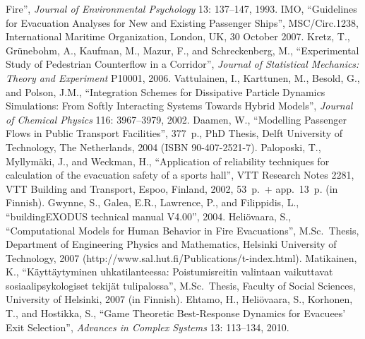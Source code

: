 \documentclass[12pt,a4paper,final,twoside]{stylevk}
\begin{document}
\begin{thebibliography}{99}
  Fire'', \emph{Journal of Environmental Psychology} 13: 137--147,
  1993.
%
%
 IMO, ``Guidelines for Evacuation Analyses for
  New and Existing Passenger Ships'', MSC/Circ.1238, International
  Maritime Organization, London, UK, 30 October 2007.
%
 Kretz, T., Gr\"unebohm, A., Kaufman, M., Mazur, F.,
  and Schreckenberg, M., ``Experimental Study of Pedestrian
  Counterflow in a Corridor'', \emph{Journal of Statistical Mechanics:
  Theory and Experiment} P10001, 2006.
%
 Vattulainen, I., Karttunen, M., Besold, G.,
  and Polson, J.M., ``Integration Schemes for Dissipative Particle
  Dynamics Simulations: From Softly Interacting Systems Towards Hybrid
  Models'', \emph{Journal of Chemical Physics} 116: 3967--3979, 2002.
%
 Daamen, W., ``Modelling Passenger Flows in Public
  Transport Facilities'', 377~p., PhD Thesis, Delft University of
  Technology, The Netherlands, 2004 (ISBN 90-407-2521-7).
%
 Paloposki, T., Myllym\"aki, J., and Weckman, H.,
  ``Application of reliability techniques for calculation of the
  evacuation safety of a sports hall'', VTT Research Notes 2281, VTT
  Building and Transport, Espoo, Finland, 2002, 53~p.~+ app.\ 13~p. (in
  Finnish).
%
 Gwynne, S., Galea, E.R., Lawrence, P., and
  Filippidis, L., ``buildingEXODUS technical manual V4.00'', 2004.
%
 Heli\"ovaara, S., ``Computational Models for
  Human Behavior in Fire Evacuations'', M.Sc.\ Thesis, Department of
  Engineering Physics and Mathematics, Helsinki University of
  Technology, 2007 (http://www.sal.hut.fi/Publications/t-index.html).
%
 Matikainen, K., ``K\"aytt\"aytyminen
  uhkatilanteessa: Poistumisreitin valintaan vaikuttavat
  sosiaalipsykologiset tekij\"at tulipalossa'', M.Sc.\ Thesis, Faculty
  of Social Sciences, University of Helsinki, 2007 (in Finnish).
%
 Ehtamo, H., Heli\"ovaara, S., Korhonen, T., and
  Hostikka, S., ``Game Theoretic Best-Response Dynamics for Evacuees'
  Exit Selection'', \emph{Advances in Complex Systems} 13: 113--134,
  2010.
%
\end{thebibliography}
\end{document}
